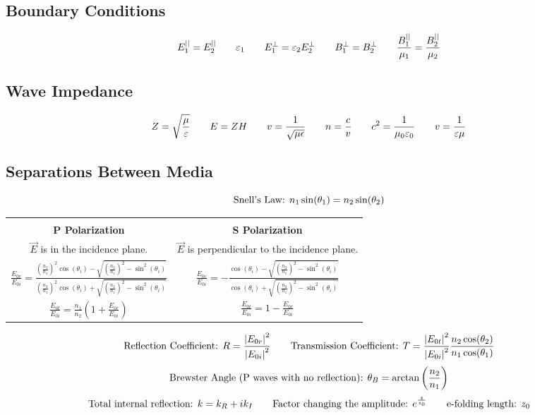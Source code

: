 \documentclass{article}
\begin{document}
\subsection*{Boundary Conditions}
\[E_1^{||}=E_2^{||}\hspace{7 mm}\varepsilon_1\hspace{7 mm}E_1^\perp=\varepsilon_2E_2^\perp\hspace{7 mm}B_1^\perp=B_2^\perp\hspace{7 mm}\frac{B_1^{||}}{\mu_1}=\frac{B_2^{||}}{\mu_2}\]
\subsection*{Wave Impedance}
\[Z=\sqrt{\frac{\mu}{\varepsilon}}\hspace{7 mm}E=ZH\hspace{7 mm}v=\frac{1}{\sqrt{\mu\epsilon}}\hspace{7 mm}n=\frac{c}{v}\hspace{7 mm}c^2=\frac{1}{\mu_0\varepsilon_0}\hspace{7 mm}v=\frac{1}{\varepsilon\mu}\]
\subsection*{Separations Between Media}
\[\textnormal{Snell's Law: }n_1\sin(\theta_1)=n_2\sin(\theta_2)\]
\begin{center}
\begin{tabular}{|| c c ||}
\hline
&\\
\textbf{P Polarization} & \textbf{S Polarization} \\[10pt]
\(\overrightarrow{E}\) is in the incidence plane. & \(\overrightarrow{E}\) is perpendicular to the incidence plane.\\[10pt]
\(\frac{E_{0r}}{E_{0i}}=\frac{\left(\frac{n_2}{n_1}\right)^2\cos(\theta_i)-\sqrt{\left(\frac{n_2}{n_1}\right)^2-\sin^2(\theta_i)}}{\left(\frac{n_2}{n_1}\right)^2\cos(\theta_i)+\sqrt{\left(\frac{n_2}{n_1}\right)^2-\sin^2(\theta_i)}}\) & \(\frac{E_{0r}}{E_{0i}}=-\frac{\cos(\theta_i)-\sqrt{\left(\frac{n_2}{n_1}\right)^2-\sin^2(\theta_i)}}{\cos(\theta_i)+\sqrt{\left(\frac{n_2}{n_1}\right)^2-\sin^2(\theta_i)}}\)\\[15pt]
\(\frac{E_{0t}}{E_{0i}}=\frac{n_1}{n_2}\left(1+\frac{E_{0r}}{E_{0i}}\right)\) & \(\frac{E_{0t}}{E_{0i}}=1-\frac{E_{0r}}{E_{0i}}\) \\[10pt]
\hline
\end{tabular}
\end{center}
\[\textnormal{Reflection Coefficient: }R=\frac{\left|E_{0r}\right|^2}{\left|E_{0i}\right|^2}\hspace{7 mm}\textnormal{Transmission Coefficient: }T=\frac{\left|E_{0t}\right|^2}{\left|E_{0i}\right|^2}\frac{n_2\cos(\theta_2)}{n_1\cos(\theta_1)}\]
\[\textnormal{Brewster Angle (P waves with no reflection): } \theta_B=\arctan\left(\frac{n_2}{n_1}\right)\]
\[\textnormal{Total internal reflection: }k=k_R+ik_I\hspace{7 mm}\textnormal{Factor changing the amplitude: }e^{\frac{z}{z_0}}\hspace{7 mm}\textnormal{e-folding length: }z_0\]
\end{document}
